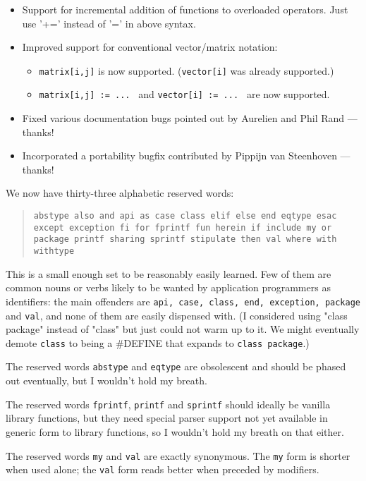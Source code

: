 \begin{itemize}
\begin{itemize}
\begin{itemize}
\begin{verbatim}
\end{verbatim}
\end{itemize}
\end{itemize}
\item Support for incremental addition of functions to overloaded operators. Just use '+=' instead of '=' in above syntax.
\item Improved support for conventional vector/matrix notation:
\begin{itemize}
\item {\tt matrix[i,j]} is now supported. ({\tt vector[i]} was already supported.)
\item {\tt matrix[i,j] := ... } and {\tt vector[i] := ... } are now supported.
\end{itemize}
\item Fixed various documentation bugs pointed out by Aurelien and Phil Rand --- thanks!
\item Incorporated a portability bugfix contributed by Pippijn van Steenhoven --- thanks!
\end{itemize}

We now have thirty-three alphabetic reserved words:
\begin{quotation}
{\tt abstype also and api as case class elif else end eqtype esac except 
exception fi for fprintf fun herein if include my or package printf 
sharing sprintf stipulate then val where with withtype}
\end{quotation}
This is a small enough set to be reasonably easily learned.  Few of 
them are common nouns or verbs likely to be wanted by application programmers 
as identifiers: the main offenders are {\tt api, case, class, end, exception, package} and {\tt val}, 
and none of them are easily dispensed with.  (I considered using "class package" 
instead of "class" but just could not warm up to it. We might eventually demote 
{\tt class} to being a \#DEFINE that expands to {\tt class package}.)

The reserved words {\tt abstype} and {\tt eqtype} are obsolescent and should be phased out 
eventually, but I wouldn't hold my breath.

The reserved words {\tt fprintf}, 
{\tt printf} and {\tt sprintf} should ideally be vanilla library functions, 
but they need special parser support not yet available in generic form to 
library functions, so I wouldn't hold my breath on that either.

The reserved words {\tt my} and {\tt val} are exactly synonymous.  The 
{\tt my} form is shorter when used alone; the {\tt val} form reads better 
when preceded by modifiers.

